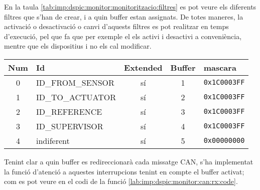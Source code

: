 En la taula  \ref{tab:imp:dspic:monitor:monitoritzacio:filtres} es pot veure els diferents filtres que s'han de crear, i a quin buffer estan assignats. De totes maneres, la activació o desactivació o canvi d'aquests filtres es pot realitzar en temps d'execució, pel que fa que per exemple el \Monitor els activi i desactivi a conveniència, mentre que els dispositius \Controlador i \SensorActuador no els cal modificar.

\begin{center}
	\begin{tabular}{c|l|c|c|l}
		\textbf{Num} & \textbf{Id} & \textbf{Extended} & \textbf{Buffer} & \textbf{mascara} \\
		\hline
		0 & ID\_FROM\_SENSOR & sí & 1 & \texttt{0x1C0003FF} \\
		\hline
		1 & ID\_TO\_ACTUATOR & sí & 2 & \texttt{0x1C0003FF} \\
		\hline
		2 & ID\_REFERENCE & sí & 3 & \texttt{0x1C0003FF} \\
		\hline
		3 & ID\_SUPERVISOR & sí & 4 & \texttt{0x1C0003FF} \\
		\hline
		4 & indiferent & sí & 5 & \texttt{0x00000000} \\
		\hline
	\end{tabular}
	\label{tab:imp:dspic:monitor:monitoritzacio:filtres}
\end{center}

Tenint clar a quin buffer es redireccionarà cada missatge CAN, s'ha implementat la funció d'atenció a aquestes interrupcions tenint en compte el buffer activat; com es pot veure en el codi de la funció \ref{lab:imp:dspic:monitor:can:rx:code}.

